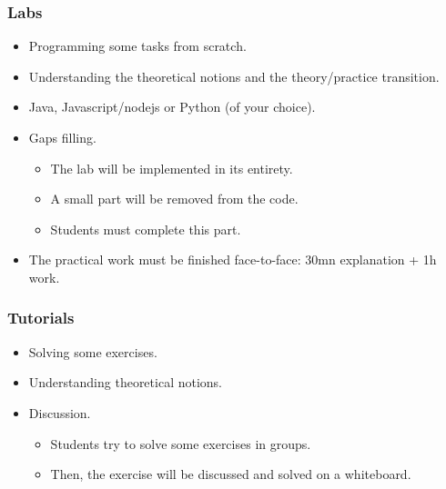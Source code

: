 \documentclass{beamer}
\begin{document}
\begin{frame}
	\frametitle{Labs}
	
	\begin{itemize}
		\item Programming some tasks from scratch.
		\item {} Understanding the theoretical notions and the theory/practice transition.
		\item {} Java, Javascript/nodejs or Python (of your choice).
		\item {} Gaps filling.
		\begin{itemize}
			\item The lab will be implemented in its entirety.
			\item A small part will be removed from the code.
			\item Students must complete this part.
		\end{itemize}
		\item The practical work must be finished face-to-face: 30mn explanation + 1h work.
	\end{itemize}
	
\end{frame}

\begin{frame}
	\frametitle{Tutorials}
	
	\begin{itemize}
		\item Solving some exercises.
		\item {} Understanding theoretical notions.
		\item {} Discussion.
		\begin{itemize}
			\item Students try to solve some exercises in groups.
			\item Then, the exercise will be discussed and solved on a whiteboard.
		\end{itemize}
	\end{itemize}
	
\end{frame}
\end{document}
